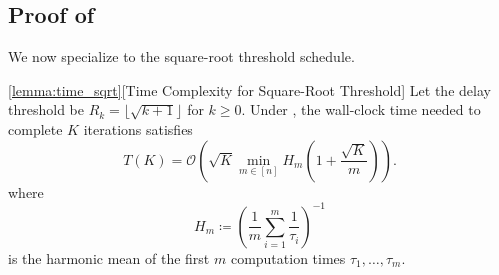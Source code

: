 \documentclass{article}
\begin{document}
\subsection{Proof of }\label{proof:sqrt_threshold}
% 
We now specialize  to the square-root threshold schedule.
\begin{restate-lemma}{\ref{lemma:time_sqrt}}[Time Complexity for Square-Root Threshold]
    Let the delay threshold be $R_k = \lfloor \sqrt{k+1} \rfloor$ for $k \ge 0$.
    Under , the wall-clock time needed to complete $K$ iterations satisfies
    \begin{equation*}
        T(K)
        = \mathcal{O}\left(
            \sqrt{K}\min_{m \in [n]} H_m \left( 1 + \frac{\sqrt{K}}{m} \right)
        \right).
    \end{equation*}
    where
    \begin{equation*}
        H_m \coloneqq \left(\frac{1}{m}\sum_{i=1}^{m}\frac{1}{\tau_i}\right)^{-1}
    \end{equation*}
    is the harmonic mean of the first $m$ computation times $\tau_1,\dots,\tau_m$.
\end{restate-lemma}
% 
\end{document}
